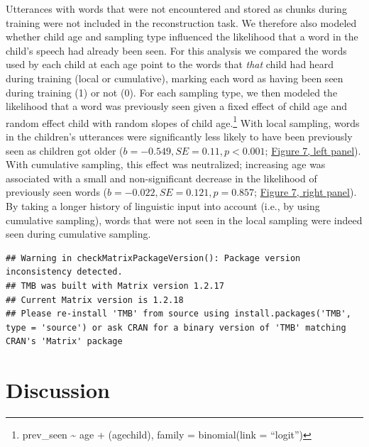 \documentclass[
  english,
  man,mask,floatsintext]{apa6}
\begin{document}
Utterances with words that were not encountered and stored as chunks during training were not included in the reconstruction task. We therefore also modeled whether child age and sampling type influenced the likelihood that a word in the child's speech had already been seen. For this analysis we compared the words used by each child at each age point to the words that \emph{that} child had heard during training (local or cumulative), marking each word as having been seen during training (1) or not (0). For each sampling type, we then modeled the likelihood that a word was previously seen given a fixed effect of child age and random effect child with random slopes of child age.\footnote{prev\_seen \textasciitilde{} age + (age\textbar child), family = binomial(link = \enquote{logit})} With local sampling, words in the children's utterances were significantly less likely to have been previously seen as children got older (\(b = -0.549, SE = 0.11, p < 0.001\); \protect\hyperlink{fig7}{Figure 7, left panel}). With cumulative sampling, this effect was neutralized; increasing age was associated with a small and non-significant decrease in the likelihood of previously seen words (\(b = -0.022, SE = 0.121, p = 0.857\); \protect\hyperlink{fig7}{Figure 7, right panel}). By taking a longer history of linguistic input into account (i.e., by using cumulative sampling), words that were not seen in the local sampling were indeed seen during cumulative sampling.

\begin{verbatim}
## Warning in checkMatrixPackageVersion(): Package version inconsistency detected.
## TMB was built with Matrix version 1.2.17
## Current Matrix version is 1.2.18
## Please re-install 'TMB' from source using install.packages('TMB', type = 'source') or ask CRAN for a binary version of 'TMB' matching CRAN's 'Matrix' package
\end{verbatim}

\hypertarget{discussion}{%
\section{Discussion}\label{discussion}}
\end{document}
